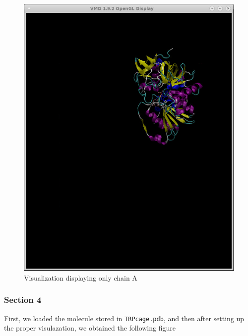 \documentclass[11pt]{article}
\makeatletter
\def\maxwidth{\ifdim\Gin@nat@width>\linewidth\linewidth
    \else\Gin@nat@width\fi}
\let\Oldincludegraphics\includegraphics
\renewcommand{\includegraphics}[1]{\Oldincludegraphics[width=.8\maxwidth]{#1}}
\makeatother
\begin{document}
\begin{figure}
\centering
\includegraphics{Screenshot_ladh_only_chain_A.png}
\caption{Visualization displaying only chain A}
\end{figure}

\subsubsection{Section 4}\label{section-4}

First, we loaded the molecule stored in \texttt{TRPcage.pdb}, and then
after setting up the proper visulazation, we obtained the following
figure
\end{document}
